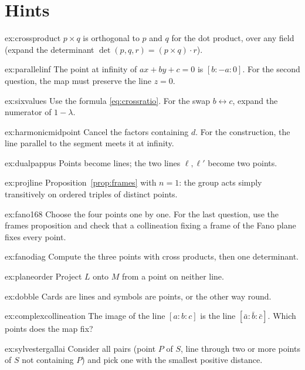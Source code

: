 \section{Hints}

\begin{hint}{ex:crossproduct}
$p\times q$ is orthogonal to $p$ and $q$ for the dot product, over any field (expand the determinant $\det(p,q,r)=(p\times q)\cdot r$).
\end{hint}
\begin{hint}{ex:parallelinf}
The point at infinity of $ax+by+c=0$ is $[b:-a:0]$. For the second question, the map must preserve the line $z=0$.
\end{hint}
\begin{hint}{ex:sixvalues}
Use the formula \eqref{eq:crossratio}. For the swap $b\leftrightarrow c$, expand the numerator of $1-\lambda$.
\end{hint}
\begin{hint}{ex:harmonicmidpoint}
Cancel the factors containing $d$. For the construction, the line parallel to the segment meets it at infinity.
\end{hint}
\begin{hint}{ex:dualpappus}
Points become lines; the two lines $\ell,\ell'$ become two points.
\end{hint}
\begin{hint}{ex:projline}
Proposition~\ref{prop:frames} with $n=1$: the group acts simply transitively on ordered triples of distinct points.
\end{hint}
\begin{hint}{ex:fano168}
Choose the four points one by one. For the last question, use the frames proposition and check that a collineation fixing a frame of the Fano
plane fixes every point.
\end{hint}
\begin{hint}{ex:fanodiag}
Compute the three points with cross products, then one determinant.
\end{hint}
\begin{hint}{ex:planeorder}
Project $L$ onto $M$ from a point on neither line.
\end{hint}
\begin{hint}{ex:dobble}
Cards are lines and symbols are points, or the other way round.
\end{hint}
\begin{hint}{ex:complexcollineation}
The image of the line $[a:b:c]$ is the line $[\bar a:\bar b:\bar c]$. Which points does the map fix?
\end{hint}
\begin{hint}{ex:sylvestergallai}
Consider all pairs (point $P$ of $S$, line through two or more points of $S$ not containing $P$) and pick one with the smallest positive distance.
\end{hint}

